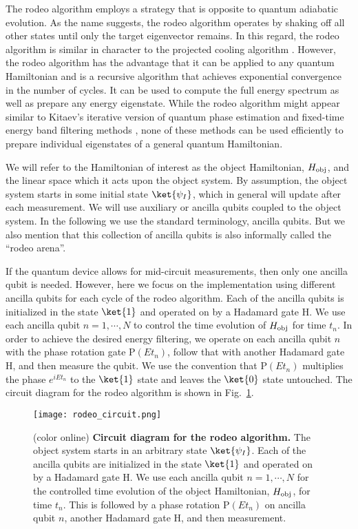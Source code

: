 
The rodeo algorithm employs a strategy that is opposite to quantum adiabatic evolution.  As the name suggests, the rodeo algorithm operates by shaking off all other states until only the target eigenvector remains.  In this regard, the rodeo algorithm is similar in character to the projected cooling algorithm \cite{Lee:2019zze,Gustafson:2020vqg}.  However, the rodeo algorithm has the advantage that it can be applied to any quantum Hamiltonian and is a recursive algorithm that achieves exponential convergence in the number of cycles.  It can be used to compute the full energy spectrum as well as prepare any energy eigenstate. While the rodeo algorithm might appear similar to Kitaev's iterative version of quantum phase estimation \cite{Kitaev:1995} and fixed-time energy band filtering methods \cite{Ge:2017,Lu:2020}, none of these methods can be used efficiently to prepare individual eigenstates of a general quantum Hamiltonian.

We will refer to the Hamiltonian of interest as the object Hamiltonian, $H_{\rm obj}$, and the linear space which it acts upon the object system. By assumption, the object system starts in some initial state $\ket{\psi_I}$, which in general will update after each measurement. We will use auxiliary or ancilla qubits coupled to the object system.  In the following we use the standard terminology, ancilla qubits. But we also mention that this collection of ancilla qubits is also informally called the ``rodeo arena''.

If the quantum device allows for mid-circuit measurements, then only one ancilla qubit is needed.  However, here we focus on the implementation using different ancilla qubits for each cycle of the rodeo algorithm.  Each of the ancilla qubits is initialized in the state $\ket{1}$ and operated on by a Hadamard gate H.  We use each ancilla qubit $n=1, \cdots, N$ to control the time evolution of $H_{\rm obj}$ for time $t_n$.  In order to achieve the desired energy filtering, we operate on each ancilla qubit $n$ with the phase rotation gate P$(Et_n)$, follow that with another Hadamard gate H, and then measure the qubit.  We use the convention that P$(Et_n)$ multiplies the phase $e^{iEt_n}$ to the $\ket{1}$ state and leaves the $\ket{0}$ state untouched. The circuit diagram for the rodeo algorithm is shown in Fig.~\ref{rodeo_circuit}.

\begin{figure}
\centering
\texttt{[image: rodeo\_circuit.png]}
\caption{(color online) {\bf Circuit diagram for the rodeo algorithm.} The object system starts in an arbitrary state $\ket{\psi_I}$.  Each of the ancilla qubits are initialized in the state $\ket{1}$ and operated on by a Hadamard gate H.  We use each ancilla qubit $n=1, \cdots, N$ for the controlled time evolution of the object Hamiltonian, $H_{\rm obj}$, for time $t_n$.  This is followed by a phase rotation P$(Et_n)$ on ancilla qubit $n$, another Hadamard gate H, and then measurement.}
\label{rodeo_circuit}
\end{figure} 

